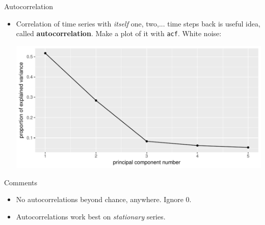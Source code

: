\begin{frame}[fragile]{Autocorrelation}
  
  \begin{itemize}
  \item Correlation of time series with \emph{itself} one, two,... time
    steps back is useful idea, called \textbf{autocorrelation}. Make a plot
    of it with \texttt{acf}. White noise: 
\begin{knitrout}
\color{fgcolor}\begin{kframe}
\begin{alltt}
\end{alltt}
\end{kframe}
\includegraphics[width=\maxwidth]{figure/unnamed-chunk-18-1} 

\end{knitrout}
  \end{itemize}
  
\end{frame}

\begin{frame}[fragile]{Comments}
  
  \begin{itemize}
\item No autocorrelations beyond chance, anywhere. Ignore 0.

\item Autocorrelations work best on \emph{stationary} series.
  \end{itemize}
  
\end{frame}


